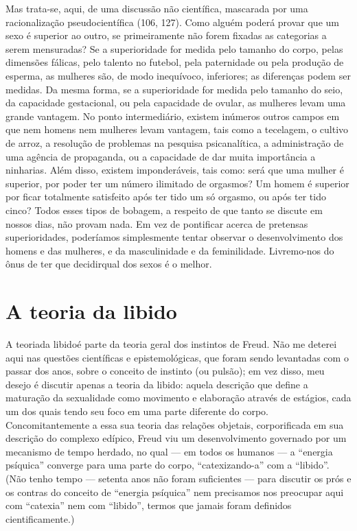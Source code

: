  Mas trata-se, aqui, de uma discussão não científica, mascarada por uma racionalização pseudocientífica (106, 127). Como alguém poderá provar que um sexo é superior ao outro, se primeiramente não forem fixadas as
categorias a serem mensuradas? Se a superioridade for medida pelo
tamanho do corpo, pelas dimensões fálicas, pelo talento no futebol,
pela paternidade ou pela produção de esperma, as mulheres são, de modo
inequívoco, inferiores; as diferenças podem ser medidas. Da mesma
forma, se a superioridade for medida pelo tamanho do seio, da
capacidade gestacional, ou pela capacidade de ovular, as mulheres levam
uma grande vantagem. No ponto intermediário, existem inúmeros outros
campos em que nem homens nem mulheres levam vantagem, tais como a
tecelagem, o cultivo de arroz, a resolução de problemas na pesquisa
psicanalítica, a administração de uma agência de propaganda, ou a
capacidade de dar muita importância a ninharias. Além disso, existem
imponderáveis, tais como: será que uma mulher é superior, por poder ter
um número ilimitado de orgasmos? Um homem é superior por ficar
totalmente satisfeito após ter tido um só orgasmo, ou após ter tido
cinco? Todos esses tipos de bobagem, a respeito de que tanto se discute
em nossos dias, não provam nada. Em vez de pontificar acerca de
pretensas superioridades, poderíamos simplesmente tentar observar o
desenvolvimento dos homens e das mulheres, e da masculinidade e da
feminilidade. Livremo-nos do ônus de ter que decidir\idxpenisprim[|)] qual dos sexos é o
melhor.


\section{A teoria da libido}

 A teoria\idxsociadese[|(] da libido\idxlibid[|(] é parte da teoria geral dos instintos de Freud.
Não me deterei aqui nas questões científicas e epistemológicas, que
foram sendo levantadas com o passar dos anos, sobre o conceito de
instinto (ou pulsão); em vez disso, meu desejo é discutir apenas a
teoria da libido: aquela descrição que define a maturação da
sexualidade como movimento e elaboração através de estágios, cada um
dos quais tendo seu foco em uma parte diferente do corpo.
Concomitantemente a essa sua teoria das relações objetais,
corporificada em sua descrição do complexo edípico, Freud viu um
desenvolvimento governado por um mecanismo de tempo herdado, no qual ---
em todos os humanos --- a ``energia psíquica''\idxenerg{} converge para uma parte do corpo, ``catexizando-a'' com a ``libido''. (Não tenho tempo --- setenta anos não foram suficientes --- para discutir os prós e os contras do conceito de ``energia psíquica'' nem precisamos nos preocupar aqui com ``catexia'' nem com
``libido'', termos que jamais foram definidos cientificamente.)


